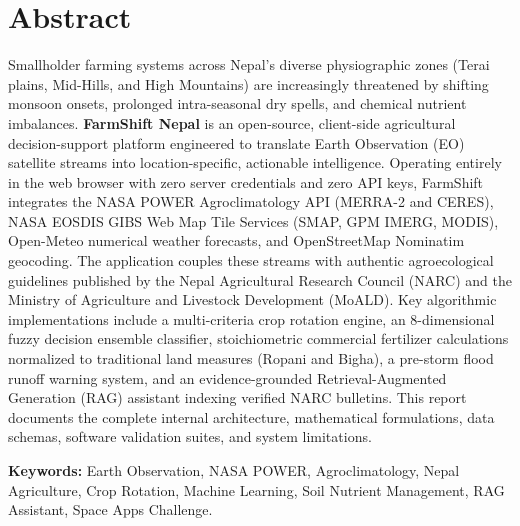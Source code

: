 \documentclass[11pt,a4paper]{report}
\begin{document}

\chapter*{Abstract}
Smallholder farming systems across Nepal's diverse physiographic zones (Terai plains, Mid-Hills, and High Mountains) are increasingly threatened by shifting monsoon onsets, prolonged intra-seasonal dry spells, and chemical nutrient imbalances. \textbf{FarmShift Nepal} is an open-source, client-side agricultural decision-support platform engineered to translate Earth Observation (EO) satellite streams into location-specific, actionable intelligence. Operating entirely in the web browser with zero server credentials and zero API keys, FarmShift integrates the NASA POWER Agroclimatology API (MERRA-2 and CERES), NASA EOSDIS GIBS Web Map Tile Services (SMAP, GPM IMERG, MODIS), Open-Meteo numerical weather forecasts, and OpenStreetMap Nominatim geocoding. The application couples these streams with authentic agroecological guidelines published by the Nepal Agricultural Research Council (NARC) and the Ministry of Agriculture and Livestock Development (MoALD). Key algorithmic implementations include a multi-criteria crop rotation engine, an 8-dimensional fuzzy decision ensemble classifier, stoichiometric commercial fertilizer calculations normalized to traditional land measures (Ropani and Bigha), a pre-storm flood runoff warning system, and an evidence-grounded Retrieval-Augmented Generation (RAG) assistant indexing verified NARC bulletins. This report documents the complete internal architecture, mathematical formulations, data schemas, software validation suites, and system limitations.

\vspace{0.8cm}
\noindent \textbf{Keywords:} Earth Observation, NASA POWER, Agroclimatology, Nepal Agriculture, Crop Rotation, Machine Learning, Soil Nutrient Management, RAG Assistant, Space Apps Challenge.
\end{document}
